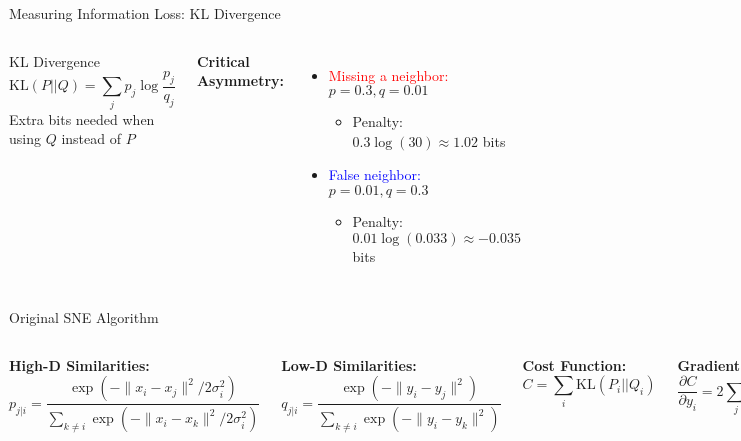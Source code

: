 \begin{frame}{Measuring Information Loss: KL Divergence}
\begin{columns}
\begin{block}{KL Divergence}
$$\text{KL}(P||Q) = \sum_j p_j \log\frac{p_j}{q_j}$$
  Extra bits needed when using $Q$ instead of $P$
  \end{block}

\textbf{Critical Asymmetry:}
\begin{itemize}
\item \textcolor{red}{Missing a neighbor:} $p=0.3, q=0.01$
  \begin{itemize}
\item Penalty: $0.3 \log(30) \approx 1.02$ bits
\end{itemize}
\item \textcolor{blue}{False neighbor:} $p=0.01, q=0.3$
  \begin{itemize}
\item Penalty: $0.01 \log(0.033) \approx -0.035$ bits
\end{itemize}
\end{itemize}

\begin{center}
\end{center}
\end{columns}

\vspace{0.3cm}
\end{frame}

\begin{frame}{Original SNE Algorithm}
\begin{columns}
\textbf{High-D Similarities:}
$$p_{j|i} = \frac{\exp(-\|x_i-x_j\|^2/2\sigma_i^2)}{\sum_{k \neq i}\exp(-\|x_i-x_k\|^2/2\sigma_i^2)}$$
  
  \textbf{Low-D Similarities:}
$$q_{j|i} = \frac{\exp(-\|y_i-y_j\|^2)}{\sum_{k \neq i}\exp(-\|y_i-y_k\|^2)}$$
  
\textbf{Cost Function:}
$$C = \sum_i \text{KL}(P_i||Q_i)$$
  
  \textbf{Gradient:}
$$\frac{\partial C}{\partial y_i} = 2\sum_j (p_{j|i} - q_{j|i} + p_{i|j} - q_{i|j})(y_i - y_j)$$
  \end{columns}

\vspace{0.3cm}
\end{frame}

